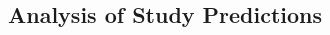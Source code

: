 \begin{CJK}{UTF8}{gbsn}















%
%








\section{Analysis of Study Predictions\label{app9:analysisStudyPredictions}}



\end{CJK}
